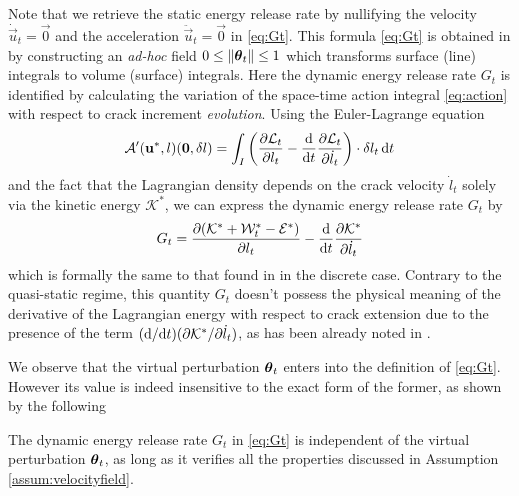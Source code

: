 Note that we retrieve the static energy release rate \cite{Destuynder:1981} by nullifying the velocity $\dot{\vec{u}}_t=\vec{0}$ and the acceleration $\ddot{\vec{u}}_t=\vec{0}$ in \eqref{eq:Gt}. This formula \eqref{eq:Gt} is obtained in \cite{AttiguiPetit:1996} by constructing an \emph{ad-hoc} field $0\leq\norm{\vtheta_t}\leq 1$ which transforms surface (line) integrals to volume (surface) integrals. Here the dynamic energy release rate $G_t$ is identified by calculating the variation of the space-time action integral \eqref{eq:action} with respect to crack increment \emph{evolution}. Using the Euler-Lagrange equation 
\[
\mathcal{A}'(\vec{u}^*,l)(\vec{0},\delta l)=\int_I\left(\frac{\partial\mathcal{L}_t}{\partial l_t}-\frac{\md}{\md t}\frac{\partial\mathcal{L}_t}{\partial\dot{l}_t}\right)\cdot\delta l_t\D{t}
\]
and the fact that the Lagrangian density depends on the crack velocity $\dot{l}_t$ solely via the kinetic energy $\mathcal{K}^*$, we can express the dynamic energy release rate $G_t$ by
\[
G_t=\frac{\partial(\mathcal{K}^*+\mathcal{W}_t^*-\mathcal{E}^*)}{\partial l_t}-\frac{\mathrm{d}}{\mathrm{d} t}\frac{\partial\mathcal{K}^*}{\partial\dot{l}_t}
\]
which is formally the same to that found in \cite{AbdelmoulaDebruyne:2014} in the discrete case. Contrary to the quasi-static regime, this quantity $G_t$ doesn't possess the physical meaning of the derivative of the Lagrangian energy with respect to crack extension due to the presence of the term $(\mathrm{d}/\mathrm{d} t)(\partial\mathcal{K}^*/\partial\dot{l}_t)$, as has been already noted in \cite{NishiokaAtluri:1983,AttiguiPetit:1997}.

We observe that the virtual perturbation $\vtheta_t$ enters into the definition of \eqref{eq:Gt}. However its value is indeed insensitive to the exact form of the former, as shown by the following
\begin{proposition} \label{prop:independenceGt}
The dynamic energy release rate $G_t$ in \eqref{eq:Gt} is independent of the virtual perturbation $\vtheta_t$, as long as it verifies all the properties discussed in Assumption \ref{assum:velocityfield}.
\end{proposition}

